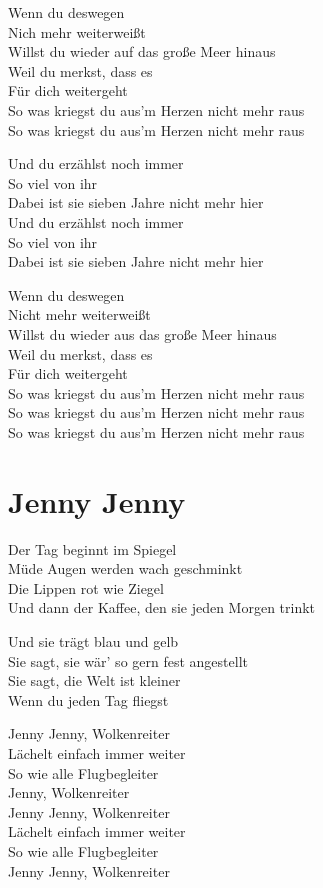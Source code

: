 \documentclass[]{book}
\begin{document}
Wenn du deswegen\\
Nich mehr weiterweißt\\
Willst du wieder auf das große Meer hinaus\\
Weil du merkst, dass es\\
Für dich weitergeht\\
So was kriegst du aus'm Herzen nicht mehr raus\\
So was kriegst du aus'm Herzen nicht mehr raus

Und du erzählst noch immer\\
So viel von ihr\\
Dabei ist sie sieben Jahre nicht mehr hier\\
Und du erzählst noch immer\\
So viel von ihr\\
Dabei ist sie sieben Jahre nicht mehr hier

Wenn du deswegen\\
Nicht mehr weiterweißt\\
Willst du wieder aus das große Meer hinaus\\
Weil du merkst, dass es\\
Für dich weitergeht\\
So was kriegst du aus'm Herzen nicht mehr raus\\
So was kriegst du aus'm Herzen nicht mehr raus\\
So was kriegst du aus'm Herzen nicht mehr raus

\hypertarget{jenny-jenny}{%
\section{Jenny Jenny}\label{jenny-jenny}}

Der Tag beginnt im Spiegel\\
Müde Augen werden wach geschminkt\\
Die Lippen rot wie Ziegel\\
Und dann der Kaffee, den sie jeden Morgen trinkt

Und sie trägt blau und gelb\\
Sie sagt, sie wär' so gern fest angestellt\\
Sie sagt, die Welt ist kleiner\\
Wenn du jeden Tag fliegst

Jenny Jenny, Wolkenreiter\\
Lächelt einfach immer weiter\\
So wie alle Flugbegleiter\\
Jenny, Wolkenreiter\\
Jenny Jenny, Wolkenreiter\\
Lächelt einfach immer weiter\\
So wie alle Flugbegleiter\\
Jenny Jenny, Wolkenreiter
\end{document}
